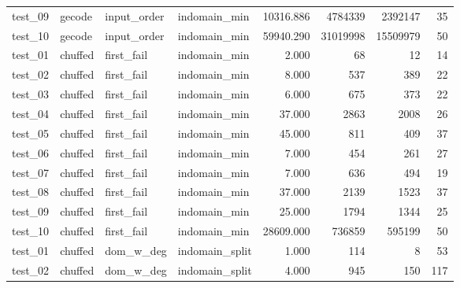 \begin{longtable}{l l l l r r r r}
    test\_09         & gecode          & input\_order      & indomain\_min     & 10316.886          & 4784339        & 2392147           & 35             \\
    test\_10         & gecode          & input\_order      & indomain\_min     & 59940.290          & 31019998       & 15509979          & 50             \\
    \midrule
    test\_01         & chuffed         & first\_fail       & indomain\_min     & 2.000              & 68             & 12                & 14             \\
    test\_02         & chuffed         & first\_fail       & indomain\_min     & 8.000              & 537            & 389               & 22             \\
    test\_03         & chuffed         & first\_fail       & indomain\_min     & 6.000              & 675            & 373               & 22             \\
    test\_04         & chuffed         & first\_fail       & indomain\_min     & 37.000             & 2863           & 2008              & 26             \\
    test\_05         & chuffed         & first\_fail       & indomain\_min     & 45.000             & 811            & 409               & 37             \\
    test\_06         & chuffed         & first\_fail       & indomain\_min     & 7.000              & 454            & 261               & 27             \\
    test\_07         & chuffed         & first\_fail       & indomain\_min     & 7.000              & 636            & 494               & 19             \\
    test\_08         & chuffed         & first\_fail       & indomain\_min     & 37.000             & 2139           & 1523              & 37             \\
    test\_09         & chuffed         & first\_fail       & indomain\_min     & 25.000             & 1794           & 1344              & 25             \\
    test\_10         & chuffed         & first\_fail       & indomain\_min     & 28609.000          & 736859         & 595199            & 50             \\
    \midrule
    test\_01         & chuffed         & dom\_w\_deg       & indomain\_split   & 1.000              & 114            & 8                 & 53             \\
    test\_02         & chuffed         & dom\_w\_deg       & indomain\_split   & 4.000              & 945            & 150               & 117            \\

\end{longtable}
